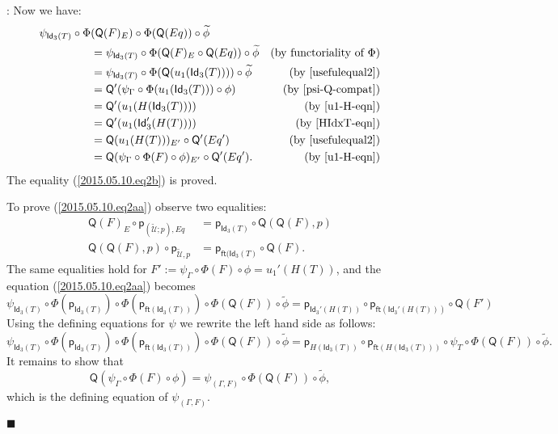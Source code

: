 \documentclass[12pt]{article}
\numberwithin{equation}{section}
\newenvironment{eq}{\begin{equation}}{\end{equation}}
\newenvironment{myproof}{{\bf Proof}:}{$\blacksquare$ \vskip 5mm }
\newcommand{\by}[1]{\text{(by #1)}}
\newcommand{\wt}{\widetilde}
\newcommand{\ft}{\mathsf{ft}}
\newcommand{\p}{\mathsf{p}}
\newcommand{\Idx}{\mathsf{Id}_3} %
\newcommand{\U}{\mathcal{U}}
\newcommand{\Q}{\mathsf{Q}}
\begin{document}
\begin{myproof}
Now we have:
%
\begin{align*}
        \psi_{\Idx(T)}\circ \Phi&(\Q(F)_E) \circ \Phi(\Q(Eq))\circ\wt{\phi} \\
    & = \psi_{\Idx(T)}\circ \Phi (\Q(F)_E  \circ \Q(Eq))     \circ\wt{\phi} & \by{functoriality of $\Phi$} \\
    & = \psi_{\Idx(T)}\circ \Phi (\Q(u_1(\Idx(T))))          \circ\wt{\phi} & \by{\ref{usefulequal2}} \\
    & = \Q'(\psi_{\Gamma}\circ \Phi(u_1(\Idx(T)))\circ \phi)                & \by {\ref{psi-Q-compat}} \\
    & = \Q'(u_1(H(\Idx(T))))                                                & \by{\ref{u1-H-eqn}} \\
    & = \Q'(u_1(\Idx'(H(T))))                                               & \by{\ref{HIdxT-eqn}} \\
    & = \Q(u_1(H(T)))_{E'}\circ \Q'(Eq')                                    & \by{\ref{usefulequal2}} \\
    & = \Q(\psi_{\Gamma}\circ \Phi(F)\circ \phi)_{E'} \circ \Q'(Eq').       & \by{\ref{u1-H-eqn}} \\
\end{align*}
The equality (\ref{2015.05.10.eq2b}) is proved.

To prove (\ref{2015.05.10.eq2aa}) observe two equalities:
\begin{align}
  \Q(F)_E\circ \p_{(\wt{\U};p),Eq} & =\p_{\Idx(T)}\circ \Q(\Q(F),p) \label{usefulequal3} \\
  \Q(\Q(F),p)\circ \p_{\wt{\U},p} & =\p_{\ft(\Idx(T)}\circ \Q(F).  \label{usefulequal4}
\end{align}
%
The same equalities hold for $F' := \psi_{\Gamma}\circ\Phi(F)\circ
\phi=u_1'(H(T))$, and the equation (\ref{2015.05.10.eq2aa}) becomes
%
$$\psi_{\Idx(T)}\circ \Phi(\p_{\Idx(T)})\circ \Phi(\p_{\ft(\Idx(T))})\circ
\Phi(\Q(F))\circ \wt{\phi}=\p_{\Idx'(H(T))}\circ \p_{\ft(\Idx'(H(T)))}\circ \Q(F')$$
%
Using the defining equations for $\psi$ we rewrite the left hand side as follows:
%
$$\psi_{\Idx(T)}\circ \Phi(\p_{\Idx(T)})\circ \Phi(\p_{\ft(\Idx(T))})\circ
\Phi(\Q(F))\circ \wt{\phi}=\p_{H(\Idx(T))}\circ \p_{\ft(H(\Idx(T)))}\circ
\psi_{T}\circ \Phi(\Q(F))\circ \wt{\phi}.$$
%
It remains to show that
%
\begin{eq}
  \Q(\psi_{\Gamma}\circ \Phi(F)\circ \phi)=\psi_{(\Gamma,F)}\circ \Phi(\Q(F))\circ \wt{\phi},  \label{eqn13}
\end{eq}%
which is the defining equation of $\psi_{(\Gamma,F)}$.


\end{myproof}
\end{document}
